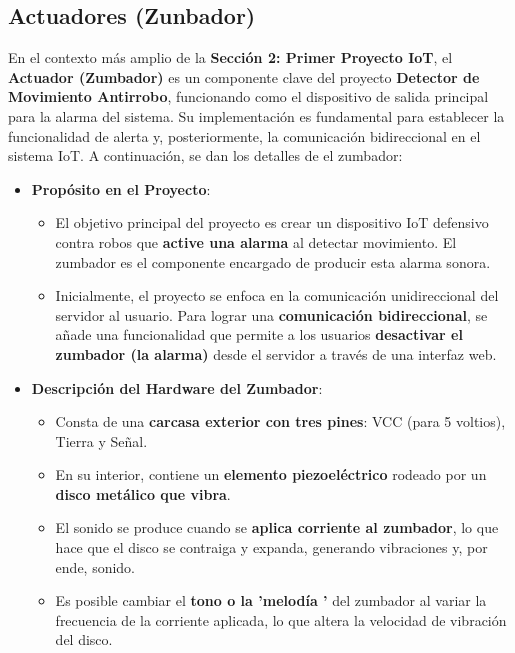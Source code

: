 \documentclass{report}
\begin{document}
\subsection{Actuadores (Zunbador)}
En el contexto más amplio de la \textbf{Sección 2: Primer Proyecto IoT}, el \textbf{Actuador (Zumbador)} es un componente clave del proyecto 
\textbf{Detector de Movimiento Antirrobo}, funcionando como el dispositivo de salida principal para la alarma del sistema. Su implementación es 
fundamental para establecer la funcionalidad de alerta y, posteriormente, la comunicación bidireccional en el sistema IoT. A continuación, se dan 
los detalles de el zumbador:

\begin{itemize}
    \item \textbf{Propósito en el Proyecto}:
    \begin{itemize}
        \item El objetivo principal del proyecto es crear un dispositivo IoT defensivo contra robos que \textbf{active una alarma} al detectar movimiento. 
        El zumbador es el componente encargado de producir esta alarma sonora.
        \item Inicialmente, el proyecto se enfoca en la comunicación unidireccional del servidor al usuario. Para lograr una \textbf{comunicación 
        bidireccional}, se añade una funcionalidad que permite a los usuarios \textbf{desactivar el zumbador (la alarma)} desde el servidor a través de 
        una interfaz web.
    \end{itemize}

    \item \textbf{Descripción del Hardware del Zumbador}:
    \begin{itemize}
        \item Consta de una \textbf{carcasa exterior con tres pines}: VCC (para 5 voltios), Tierra y Señal.
        \item En su interior, contiene un \textbf{elemento piezoeléctrico} rodeado por un \textbf{disco metálico que vibra}.
        \item El sonido se produce cuando se \textbf{aplica corriente al zumbador}, lo que hace que el disco se contraiga y expanda, generando vibraciones y, 
        por ende, sonido.
        \item Es posible cambiar el \textbf{tono o la  'melodía '} del zumbador al variar la frecuencia de la corriente aplicada, lo que altera la 
        velocidad de vibración del disco.
    \end{itemize}


\end{itemize}
\end{document}
